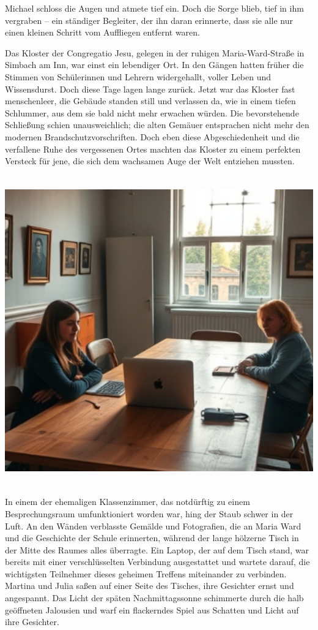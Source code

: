 \documentclass[
]{article}
\begin{document}
Michael schloss die Augen und atmete tief ein. Doch die Sorge blieb,
tief in ihm vergraben -- ein ständiger Begleiter, der ihn daran
erinnerte, dass sie alle nur einen kleinen Schritt vom Auffliegen
entfernt waren.

Das Kloster der Congregatio Jesu, gelegen in der ruhigen
Maria-Ward-Straße in Simbach am Inn, war einst ein lebendiger Ort. In
den Gängen hatten früher die Stimmen von Schülerinnen und Lehrern
widergehallt, voller Leben und Wissensdurst. Doch diese Tage lagen lange
zurück. Jetzt war das Kloster fast menschenleer, die Gebäude standen
still und verlassen da, wie in einem tiefen Schlummer, aus dem sie bald
nicht mehr erwachen würden. Die bevorstehende Schließung schien
unausweichlich; die alten Gemäuer entsprachen nicht mehr den modernen
Brandschutzvorschriften. Doch eben diese Abgeschiedenheit und die
verfallene Ruhe des vergessenen Ortes machten das Kloster zu einem
perfekten Versteck für jene, die sich dem wachsamen Auge der Welt
entziehen mussten.

\includegraphics[width=5.65625in,height=5.25in]{media/image005.png}

In einem der ehemaligen Klassenzimmer, das notdürftig zu einem
Besprechungsraum umfunktioniert worden war, hing der Staub schwer in der
Luft. An den Wänden verblasste Gemälde und Fotografien, die an Maria
Ward und die Geschichte der Schule erinnerten, während der lange
hölzerne Tisch in der Mitte des Raumes alles überragte. Ein Laptop, der
auf dem Tisch stand, war bereits mit einer verschlüsselten Verbindung
ausgestattet und wartete darauf, die wichtigsten Teilnehmer dieses
geheimen Treffens miteinander zu verbinden. Martina und Julia saßen auf
einer Seite des Tisches, ihre Gesichter ernst und angespannt. Das Licht
der späten Nachmittagssonne schimmerte durch die halb geöffneten
Jalousien und warf ein flackerndes Spiel aus Schatten und Licht auf ihre
Gesichter.
\end{document}
